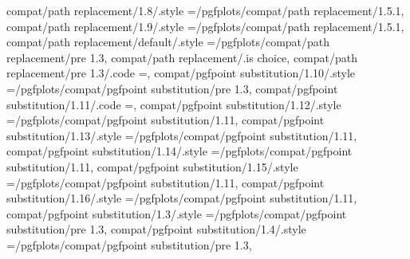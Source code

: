 {{{{{{{{{{{{{{{{{{{compat/path replacement/1.8/.style                                 ={/pgfplots/compat/path replacement/1.5.1},                                                                                         
compat/path replacement/1.9/.style                                 ={/pgfplots/compat/path replacement/1.5.1},                                                                                         
compat/path replacement/default/.style                             ={/pgfplots/compat/path replacement/pre 1.3},                                                                                      
compat/path replacement/.is choice,
compat/path replacement/pre 1.3/.code                              ={\pgfplots@path@replace@ellipsefalse},                                                                                             
compat/pgfpoint substitution/1.10/.style                           ={/pgfplots/compat/pgfpoint substitution/pre 1.3},                                                                                  
compat/pgfpoint substitution/1.11/.code                            ={\pgfplots@substitute@pgfpointtrue},                                                                                               
compat/pgfpoint substitution/1.12/.style                           ={/pgfplots/compat/pgfpoint substitution/1.11},                                                                                     
compat/pgfpoint substitution/1.13/.style                           ={/pgfplots/compat/pgfpoint substitution/1.11},                                                                                     
compat/pgfpoint substitution/1.14/.style                           ={/pgfplots/compat/pgfpoint substitution/1.11},                                                                                     
compat/pgfpoint substitution/1.15/.style                           ={/pgfplots/compat/pgfpoint substitution/1.11},                                                                                     
compat/pgfpoint substitution/1.16/.style                           ={/pgfplots/compat/pgfpoint substitution/1.11},                                                                                     
compat/pgfpoint substitution/1.3/.style                            ={/pgfplots/compat/pgfpoint substitution/pre 1.3},                                                                                 
compat/pgfpoint substitution/1.4/.style                            ={/pgfplots/compat/pgfpoint substitution/pre 1.3},                                                                                  
}}}}}}}}}}}}}}}}}}}
